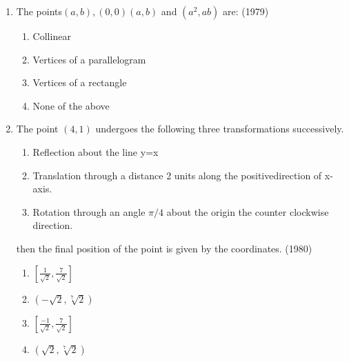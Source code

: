 \documentclass[12pt]{article}
\providecommand{\brak}[1]{\ensuremath{\left(#1\right)}}
\providecommand{\sbrak}[1]{\ensuremath{{}\left[#1\right]}}
\begin{document}
\begin{enumerate}
		\fi
\item The points$(a,b),(0,0)(a,b)$ and $(a^2,ab)$ are: (1979)
\begin{enumerate}
\item Collinear
\item Vertices of a parallelogram
\item Vertices of a rectangle
\item None of the above
\end{enumerate}
\item The point $(4,1)$ undergoes the following three transformations successively.
\begin{enumerate}
\item Reflection about the line y=x\\
\item Translation through a distance 2 units along the positivedirection of x-axis.\\
\item Rotation through an angle $\pi/4$ about the origin the counter clockwise direction.\\
\end{enumerate}

then the final position of the point is given by the coordinates. (1980)
\begin{enumerate}
\item  $\sbrak{\frac{1}{\sqrt{2}},\frac{7}{\sqrt{2}}}$
\item  $\brak{-\sqrt{2}, \sqrt[7]{2}}$  
\item  $\sbrak{\frac{-1}{\sqrt{2}},\frac{7}{\sqrt{2}}}$
\item  $\brak{\sqrt{2}, \sqrt[7]{2}}$
\end{enumerate}


\end{enumerate}
\end{document}
